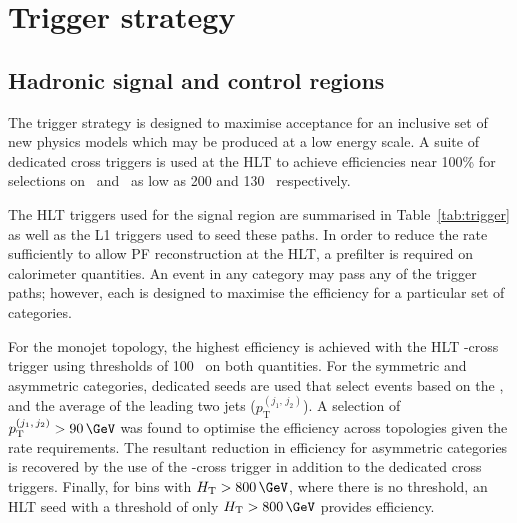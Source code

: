\section{Trigger strategy}
\label{sec:ana-trigger}

\subsection{Hadronic signal and control regions}

The trigger strategy is designed to maximise acceptance for an inclusive set of new physics 
models which may be produced at a low energy scale. A suite of dedicated cross triggers 
is used at the HLT to achieve efficiencies near 100\% for selections on
\scalht~and \mht~as low as 200 and 130 \GeV~respectively. 

The HLT triggers used for the signal region are summarised in Table~\ref{tab:trigger} as well as the L1 triggers
used to seed these paths. In order to reduce the rate sufficiently to allow PF reconstruction at the HLT,
a prefilter is required on calorimeter quantities. An event in any category may pass any of the trigger
paths; however, each is designed to maximise the efficiency for a particular set of categories.

For the monojet topology, the highest efficiency is achieved with the HLT
\mht-\met cross trigger using thresholds of 100 \GeV~on both quantities. For the symmetric and asymmetric
categories, dedicated seeds are used that select events based on the \alphat, \scalht and the 
average \pt of the leading two jets ($p^{(j_1,\,j_2)}_{\text{T}}$). A selection of
$p^{(j_1,\,j_2)}_{\text{T}} > 90\,\GeV$ was found to optimise the efficiency across topologies given the rate requirements. The resultant reduction in efficiency for 
asymmetric categories is recovered by the use of the \mht-\met cross trigger in addition to the dedicated cross triggers.
Finally, for bins with $\scalht > 800 \,\GeV$, where there is no \alphat threshold, 
an HLT seed with a threshold of only $\scalht > 800\,\GeV$ provides efficiency.



